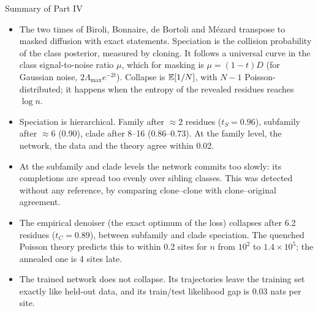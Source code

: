\begin{keybox}{Summary of Part IV}
\begin{itemize}[nosep,leftmargin=*]
\item The two times of Biroli, Bonnaire, de Bortoli and Mézard transpose to masked diffusion with exact
statements. Speciation is the collision probability of the class posterior, measured by cloning. It follows a
universal curve in the class signal-to-noise ratio $\mu$, which for masking is $\mu=(1-t)D$ (for Gaussian noise,
$2\Lambda_{\max}e^{-2t}$). Collapse is $\mathbb{E}[1/N]$, with $N-1$ Poisson-distributed; it happens when the entropy of the
revealed residues reaches $\log n$.
\item Speciation is hierarchical. Family after $\approx2$ residues ($t_S=0.96$), subfamily after $\approx6$ (0.90),
clade after 8--16 (0.86--0.73). At the family level, the network, the data and the theory agree within 0.02.
\item At the subfamily and clade levels the network commits too slowly: its completions are spread too evenly over
sibling classes. This was detected without any reference, by comparing clone--clone with clone--original agreement.
\item The empirical denoiser (the exact optimum of the loss) collapses after 6.2 residues ($t_C=0.89$), between
subfamily and clade speciation. The quenched Poisson theory predicts this to within 0.2 sites for $n$ from $10^2$ to
$1.4\times10^5$; the annealed one is 4 sites late.
\item The trained network does not collapse. Its trajectories leave the training set exactly like held-out data, and its
train/test likelihood gap is 0.03 nats per site.
\end{itemize}
\end{keybox}
